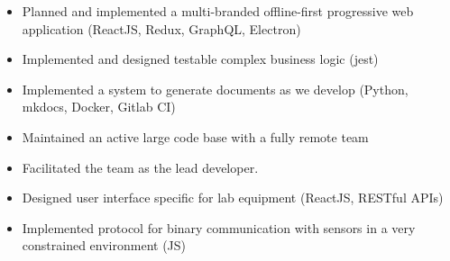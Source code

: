 \documentclass[10pt,a4paper,ragged2e]{altacv}
\newcommand\faSkype{{\FA\symbol{"F17E}}}
\begin{document}

\begin{fullwidth}
\makecvheader
\end{fullwidth}



\begin{itemize}
\item Planned and implemented a multi-branded offline-first progressive web application (ReactJS, Redux, GraphQL, Electron)
\item Implemented and designed testable complex business logic (jest)
\item Implemented a system to generate documents as we develop (Python, mkdocs, Docker, Gitlab CI)
\item Maintained an active large code base with a fully remote team
\item Facilitated the team as the lead developer.
\end{itemize}

\divider

\begin{itemize} 
\item Designed user interface specific for lab equipment (ReactJS, RESTful APIs)
\item Implemented protocol for binary communication with sensors  in a very constrained environment (JS)
\end{itemize}
\end{document}
